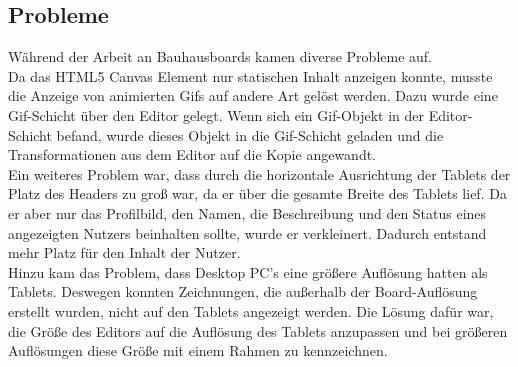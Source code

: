 \subsection{Probleme}\label{Probleme}
Während der Arbeit an Bauhausboards kamen diverse Probleme auf.
\\
Da das HTML5 Canvas Element nur statischen Inhalt anzeigen konnte, musste die Anzeige von animierten Gifs auf andere Art gelöst werden.
Dazu wurde eine Gif-Schicht über den Editor gelegt.
Wenn sich ein Gif-Objekt in der Editor-Schicht befand, wurde dieses Objekt in die Gif-Schicht geladen und die Transformationen aus dem Editor auf die Kopie angewandt.
\\
Ein weiteres Problem war, dass durch die horizontale Ausrichtung der Tablets der Platz des Headers zu groß war, da er über die gesamte Breite des Tablets lief.
Da er aber nur das Profilbild, den Namen, die Beschreibung und den Status eines angezeigten Nutzers beinhalten sollte, wurde er verkleinert.
Dadurch entstand mehr Platz für den Inhalt der Nutzer.
\\
Hinzu kam das Problem, dass Desktop PC's eine größere Auflösung hatten als Tablets.
Deswegen konnten Zeichnungen, die außerhalb der Board-Auflösung erstellt wurden, nicht auf den Tablets angezeigt werden.
Die Lösung dafür war, die Größe des Editors auf die Auflösung des Tablets anzupassen und bei größeren Auflösungen diese Größe mit einem Rahmen zu kennzeichnen.
\\


